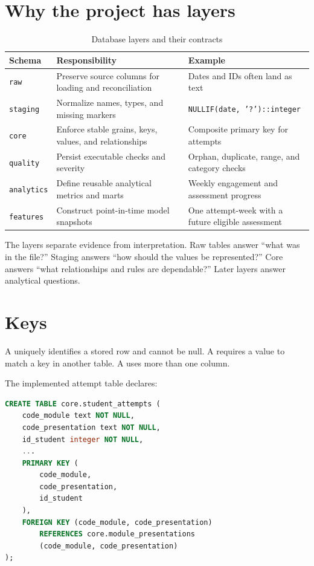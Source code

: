 \section{Why the project has layers}

\begin{table}[htbp]
\centering
\caption{Database layers and their contracts}
\label{tab:schema-layers}
\begin{tabularx}{\textwidth}{L{0.16\textwidth}L{0.29\textwidth}Y}
\toprule
Schema & Responsibility & Example \\
\midrule
\texttt{raw} & Preserve source columns for loading and reconciliation & Dates and IDs often land as text \\
\texttt{staging} & Normalize names, types, and missing markers & \texttt{NULLIF(date, '?')::integer} \\
\texttt{core} & Enforce stable grains, keys, values, and relationships & Composite primary key for attempts \\
\texttt{quality} & Persist executable checks and severity & Orphan, duplicate, range, and category checks \\
\texttt{analytics} & Define reusable analytical metrics and marts & Weekly engagement and assessment progress \\
\texttt{features} & Construct point-in-time model snapshots & One attempt-week with a future eligible assessment \\
\bottomrule
\end{tabularx}
\end{table}

\begin{plainlanguage}
The layers separate evidence from interpretation. Raw tables answer ``what was
in the file?'' Staging answers ``how should the values be represented?''
Core answers ``what relationships and rules are dependable?'' Later layers
answer analytical questions.
\end{plainlanguage}

\section{Keys}

A  uniquely identifies a stored row and cannot be null. A
 requires a value to match a key in another table. A
 uses more than one column.

The implemented attempt table declares:

\begin{lstlisting}[language=SQL,caption={Selected key and relationship clauses
from \texttt{sql/03\_core.sql}.}]
CREATE TABLE core.student_attempts (
    code_module text NOT NULL,
    code_presentation text NOT NULL,
    id_student integer NOT NULL,
    ...
    PRIMARY KEY (
        code_module,
        code_presentation,
        id_student
    ),
    FOREIGN KEY (code_module, code_presentation)
        REFERENCES core.module_presentations
        (code_module, code_presentation)
);
\end{lstlisting}

